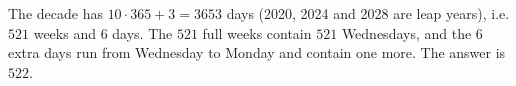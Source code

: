 The decade has $10\cdot365+3=3653$ days (2020, 2024 and 2028 are leap years), i.e. $521$ weeks and $6$ days. The $521$ full weeks contain $521$ Wednesdays, and the $6$ extra days run from Wednesday to Monday and contain one more. The answer is $\boxed{522}$.
